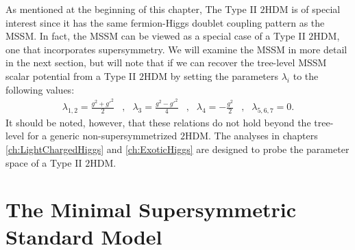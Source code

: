 As mentioned at the beginning of this chapter, The Type II $2$HDM is of special interest since it has the same fermion-Higgs doublet coupling pattern as the MSSM. In fact, the MSSM can be viewed as a special case of a Type II $2$HDM, one that incorporates supersymmetry. We will examine the MSSM in more detail in the next section, but will note that if we can recover the tree-level MSSM scalar potential from a Type II $2$HDM by setting the parameters $\lambda_i$ to the following values:
\begin{align}
\lambda_{1,2} = \frac{g^2+g'^2}{2} &,& \lambda_3 = \frac{g^2-g'^2}{4} &,& \lambda_4 = -\frac{g^2}{2}&,&\lambda_{5,6,7} = 0.
\end{align}
It should be noted, however, that these relations do not hold beyond the tree-level for a generic non-supersymmetrized $2$HDM.
The analyses in chapters \ref{ch:LightChargedHiggs} and \ref{ch:ExoticHiggs} are designed to probe the parameter space of a Type II $2$HDM.
\section{The Minimal Supersymmetric Standard Model}\label{sec:supersymmetry}

